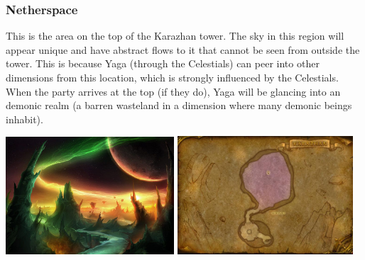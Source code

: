 \subsubsection{Netherspace}

This is the area on the top of the Karazhan tower. The sky in this region will appear unique and have abstract flows to it that cannot be seen from outside the tower. This is because Yaga (through the Celestials) can peer into other dimensions from this location, which is strongly influenced by the Celestials. When the party arrives at the top (if they do), Yaga will be glancing into an demonic realm (a barren wasteland in a dimension where many demonic beings inhabit).

\begin{center}
	\includegraphics[width=0.47\textwidth]{img/Karazhan/WoW-History-Burning-08.jpg}
	\includegraphics[width=0.49\textwidth]{img/Karazhan/cropped-3457-17.jpg}
\end{center}